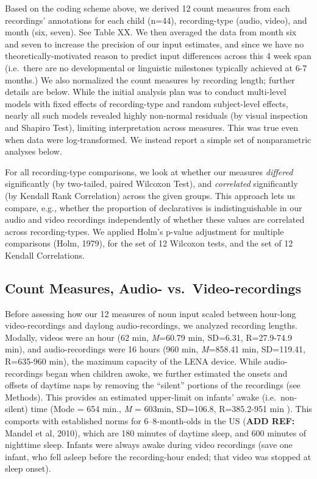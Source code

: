 \documentclass[floatsintext,man]{apa6}
\theoremstyle{definition}
\theoremstyle{definition}
\theoremstyle{definition}
\theoremstyle{remark}
\begin{document}
Based on the coding scheme above, we derived 12 count measures from each
recordings' annotations for each child (n=44), recording-type (audio,
video), and month (six, seven). See Table XX. We then averaged the data
from month six and seven to increase the precision of our input
estimates, and since we have no theoretically-motivated reason to
predict input differences across this 4 week span (i.e.~there are no
developmental or linguistic milestones typically achieved at 6-7
months.) We also normalized the count measures by recording length;
further details are below. While the initial analysis plan was to
conduct multi-level models with fixed effects of recording-type and
random subject-level effects, nearly all such models revealed highly
non-normal residuals (by visual inspection and Shapiro Test), limiting
interpretation across measures. This was true even when data were
log-transformed. We instead report a simple set of nonparametric
analyses below.

For all recording-type comparisons, we look at whether our measures
\emph{differed} significantly (by two-tailed, paired Wilcoxon Test), and
\emph{correlated} significantly (by Kendall Rank Correlation) across the
given groups. This approach lets us compare, e.g., whether the
proportion of declaratives is indistinguishable in our audio and video
recordings independently of whether these values are correlated across
recording-types. We applied Holm's p-value adjustment for multiple
comparisons (Holm, 1979), for the set of 12 Wilcoxon tests, and the set
of 12 Kendall Correlations.

\subsection{Count Measures, Audio-
vs.~Video-recordings}\label{count-measures-audio--vs.video-recordings}

Before assessing how our 12 measures of noun input scaled between
hour-long video-recordings and daylong audio-recordings, we analyzed
recording lengths. Modally, videos were an hour (62 min, \emph{M}=60.79
min, SD=6.31, R=27.9-74.9 min), and audio-recordings were 16 hours (960
min, \emph{M}=858.41 min, SD=119.41, R=635-960 min), the maximum
capacity of the LENA device. While audio-recordings began when children
awoke, we further estimated the onsets and offsets of daytime naps by
removing the \enquote{silent} portions of the recordings (see Methods).
This provides an estimated upper-limit on infants' awake
(i.e.~non-silent) time (Mode = 654 min., \emph{M} = 603min, SD=106.8,
R=385.2-951 min ). This comports with established norms for
6--8-month-olds in the US (\textbf{ADD REF:} Mandel et al, 2010), which
are 180 minutes of daytime sleep, and 600 minutes of nighttime sleep.
Infants were always awake during video recordings (save one infant, who
fell asleep before the recording-hour ended; that video was stopped at
sleep onset).
\end{document}

